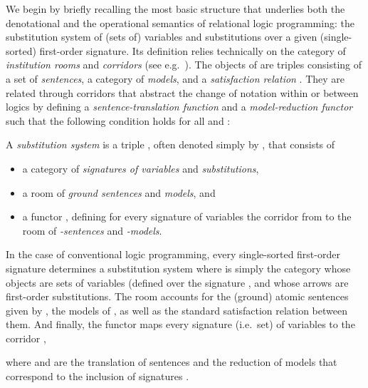 \documentclass{LMCS}
\begin{document}
  We begin by briefly recalling the most basic structure that underlies both the denotational and the operational semantics of relational logic programming: the substitution system of (sets of) variables and substitutions over a given (single-sorted) first-order signature.
  Its definition relies technically on the category  of \emph{institution rooms} and \emph{corridors} (see e.g.~\cite{Mossakowski:Comorphism-based-Grothendieck-logics-2002}). The objects of  are triples  consisting of a set  of \emph{sentences}, a category  of \emph{models}, and a \emph{satisfaction relation} . They are related through corridors  that abstract the change of notation within or between logics by defining a \emph{sentence-translation function}  and a \emph{model-reduction functor}  such that the following condition holds for all  and :
  

  \begin{defi}
    A \emph{substitution system} is a triple , often denoted simply by , that consists of
    \begin{itemize}
      
    \item a category  of \emph{signatures of variables} and \emph{substitutions}, 
      
    \item a room  of \emph{ground sentences} and \emph{models}, and 
      
    \item a functor , defining for every signature of variables  the corridor  from  to the room  of \emph{\nb-sentences} and \emph{\nb-models}.

    \end{itemize}
  \end{defi}

  \begin{exa}
    \label{example:FP-substitution-system}
    In the case of conventional logic programming, every single-sorted first-order signature  determines a substitution system 
    \aFOLssneq
where  is simply the category whose objects are sets of variables (defined over the signature , and whose arrows are first-order substitutions.  The room  accounts for the (ground) atomic sentences given by , the models of , as well as the standard satisfaction relation between them.  And finally, the functor  maps every signature (i.e.\ set) of variables  to the corridor ,
    
    where  and  are the translation of sentences and the reduction of models that correspond to the inclusion of signatures .
  \end{exa}
\end{document}

